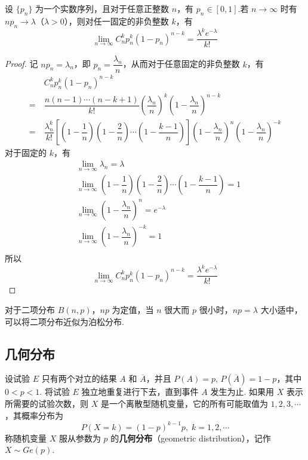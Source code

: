 \begin{theorem}[][泊松定理]
    \indent 设 $\{ p_n \}$ 为一个实数序列，且对于任意正整数 $n$，有 $p_n \in [0,1]$.若 $n \to \infty$ 时有 $n p_n \to \lambda$（$\lambda > 0$），则对任一固定的非负整数 $k$，有
    $$
    \lim_{n\to\infty} C_n^k p_n^k (1-p_n)^{n-k} = \dfrac{\lambda^k e^{-\lambda}}{k!}
    $$
\end{theorem}

\begin{proof}
    记 $n p_n=\lambda_n$，即 $p_n=\dfrac{\lambda_n}{n}$，从而对于任意固定的非负整数 $k$，有
    $$
    \begin{aligned}
        & C_n^k p_n^k (1-p_n)^{n-k} \\
        =\ & \dfrac{n(n-1) \cdots (n-k+1)}{k!} \left( \dfrac{\lambda_n}{n} \right)^k \left( 1-\dfrac{\lambda_n}{n} \right)^{n-k} \\
        =\ & \dfrac{\lambda_n^k}{k!} \left[ \left( 1-\dfrac{1}{n} \right) \left( 1-\dfrac{2}{n} \right) \cdots \left( 1-\dfrac{k-1}{n} \right) \right] \left( 1-\dfrac{\lambda_n}{n} \right)^n \left( 1-\dfrac{\lambda_n}{n} \right)^{-k}
    \end{aligned}
    $$
    对于固定的 $k$，有
    $$
    \begin{aligned}
        & \lim_{n \to \infty} \lambda_n = \lambda \\
        & \lim_{n \to \infty} \left( 1-\dfrac{1}{n} \right) \left( 1-\dfrac{2}{n} \right) \cdots \left( 1-\dfrac{k-1}{n} \right) = 1 \\
        & \lim_{n \to \infty} \left( 1-\dfrac{\lambda_n}{n} \right)^n = e^{-\lambda} \\
        & \lim_{n \to \infty} \left( 1-\dfrac{\lambda_n}{n} \right)^{-k} = 1 \\
    \end{aligned}
    $$
    所以
    $$
    \lim_{n\to\infty} C_n^k p_n^k (1-p_n)^{n-k} = \dfrac{\lambda^k e^{-\lambda}}{k!}
    $$
\end{proof}

对于二项分布 $B(n,p)$，$np$ 为定值，当 $n$ 很大而 $p$ 很小时，$np = \lambda$ 大小适中，可以将二项分布近似为泊松分布.

\subsection{几何分布}

设试验 $E$ 只有两个对立的结果 $A$ 和 $\overline{A}$，并且 $P(A)=p, \, P(\overline{A})=1-p$，其中 $0<p<1$. 将试验 $E$ 独立地重复进行下去，直到事件 $A$ 发生为止. 如果用 $X$ 表示所需要的试验次数，则 $X$ 是一个离散型随机变量，它的所有可能取值为 $1,2,3,\cdots$，其概率分布为
$$
P(X=k) = (1-p)^{k-1} p, \; k=1,2,\cdots
$$
称随机变量 $X$ 服从参数为 $p$ 的\textbf{几何分布}（geometric distribution），记作 $X \sim Ge(p)$.

